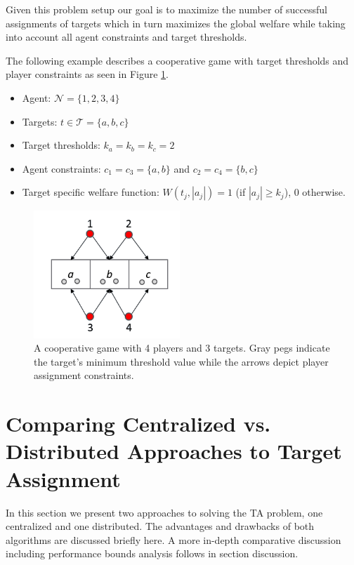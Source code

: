 \documentclass[defaultstyle,12pt]{thesis}
\newcommand{\Pl}{\mathcal{N}} %
\newcommand{\Ta}{\mathcal{T}} %
\begin{document}
Given this problem setup our goal is to maximize the number of successful assignments of targets which in turn maximizes the global welfare while taking into account all agent constraints and target thresholds.

The following example describes a cooperative game with target thresholds and player constraints as seen in Figure \ref{fig:ex1}.
\begin{itemize}
	\item Agent: $\Pl = \{1,2,3,4\}$
	\item Targets: $t \in \Ta = \{a, b, c\}$
	\item Target thresholds: $k_a = k_b = k_c = 2$
	\item Agent constraints: $c_1 = c_3 = \{a, b\}$ and $c_2 = c_4 = \{b, c\}$
	\item Target specific welfare function: $W(t_j, |a_j|) = 1$ (if $|a_j| \geq k_j$), $0$ otherwise.
	
\end{itemize}
\begin{figure}[!htb]
	\centering\includegraphics[width=5.5cm]{../assets/ex1.png}
	\centering\caption{A cooperative game with 4 players and 3 targets. Gray pegs indicate the target's minimum threshold value while the arrows depict player assignment constraints.}\label{fig:ex1}
\end{figure}

\section{Comparing Centralized vs. Distributed Approaches to Target Assignment}
In this section we present two approaches to solving the TA problem, one centralized and one distributed. The advantages and drawbacks of both algorithms are discussed briefly here. A more in-depth comparative discussion including performance bounds analysis follows in section discussion.
\end{document}
